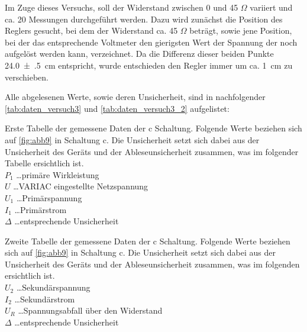 \documentclass[11pt,ngerman]{scrartcl}
\begin{document}
Im Zuge dieses Versuchs, soll der Widerstand zwischen 0 und 45 $\Omega$
variiert und ca. 20 Messungen durchgeführt werden. Dazu wird zunächst die
Position des Reglers gesucht, bei dem der Widerstand ca. 45 $\Omega$ beträgt,
sowie jene Position, bei der das entsprechende Voltmeter den gierigsten Wert
der Spannung der noch aufgelöst werden kann, verzeichnet. Da die Differenz
dieser beiden Punkte \SI{24.0(5)}{\cm} entspricht,
wurde entschieden den Regler immer um ca. \SI{1}{\cm} zu verschieben.

Alle abgelesenen Werte, sowie deren Unsicherheit, sind in nachfolgender
\autoref{tab:daten_versuch3} und \autoref{tab:daten_versuch3_2} aufgelistet:

\begin{table}[H]
	\caption{
		Erste Tabelle der gemessene Daten der c Schaltung. Folgende Werte beziehen
		sich auf \autoref{fig:abb9} in Schaltung c. Die Unsicherheit setzt sich
		dabei aus der Unsicherheit des Geräts und der Ableseunsicherheit zusammen,
		was im folgender Tabelle ersichtlich ist.\\
		$P_1$ \dots primäre Wirkleistung \\
		$U$ \dots VARIAC eingestellte Netzspannung \\
		$U_1$ \dots  Primärspannung \\
		$I_1$ \dots Primärstrom \\
		$\Delta$ \dots entsprechende Unsicherheit
	}
	\label{tab:daten_versuch3}
	\begin{center}
		
	\end{center}
\end{table}

\begin{table}[H]
	\caption{
		Zweite Tabelle der gemessene Daten der c Schaltung. Folgende Werte beziehen sich auf \autoref{fig:abb9} in Schaltung c. Die Unsicherheit setzt sich dabei aus der Unsicherheit des Geräts und der Ableseunsicherheit zusammen, was im folgenden ersichtlich ist.\\
		$U_2$ \dots Sekundärspannung  \\
		$I_2$ \dots Sekundärstrom \\
		$U_R$ \dots Spannungsabfall über den Widerstand \\
		$\Delta$ \dots entsprechende Unsicherheit
	}
	\label{tab:daten_versuch3_2}
	\begin{center}
		
	\end{center}
\end{table}
\end{document}
